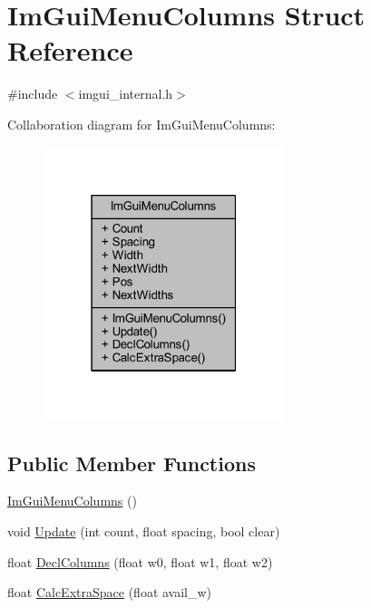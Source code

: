 \hypertarget{struct_im_gui_menu_columns}{}\section{Im\+Gui\+Menu\+Columns Struct Reference}
\label{struct_im_gui_menu_columns}


{\ttfamily \#include $<$imgui\+\_\+internal.\+h$>$}



Collaboration diagram for Im\+Gui\+Menu\+Columns\+:
\nopagebreak
\begin{figure}[H]
\begin{center}
\leavevmode
\includegraphics[width=199pt]{struct_im_gui_menu_columns__coll__graph}
\end{center}
\end{figure}
\subsection*{Public Member Functions}
\begin{DoxyCompactItemize}
\item 
\mbox{\hyperlink{struct_im_gui_menu_columns_ac476e04a9d907280b3ccdfc429845803}{Im\+Gui\+Menu\+Columns}} ()
\item 
void \mbox{\hyperlink{struct_im_gui_menu_columns_a1104dfb001d48ab8c89bb1858da0eaf8}{Update}} (int count, float spacing, bool clear)
\item 
float \mbox{\hyperlink{struct_im_gui_menu_columns_ad8d50936ca3240d75c285d7e373bc892}{Decl\+Columns}} (float w0, float w1, float w2)
\item 
float \mbox{\hyperlink{struct_im_gui_menu_columns_a56aa33999066e80cab3ca37ac2e9ba37}{Calc\+Extra\+Space}} (float avail\+\_\+w)
\end{DoxyCompactItemize}
